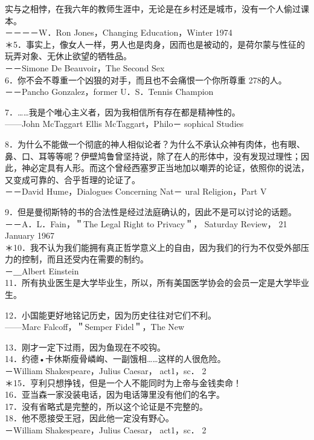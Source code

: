 实与之相悖，在我六年的教师生涯中，无论是在乡村还是城市，没有一个人偷过课本。\\
－－－－W．Ron Jones，Changing Education，Winter 1974\\
＊5．事实上，像女人一样，男人也是肉身，因而也是被动的，是荷尔蒙与性征的玩弄对象、无休止欲望的牺牲品。\\
－－Simone De Beauvoir，The Second Sex\\
6．你不会不尊重一个凶狠的对手，而且也不会痛恨一个你所尊重 278的人。\\
－－Pancho Gonzalez，former U．S．Tennis Champion

7．……我是个唯心主义者，因为我相信所有存在都是精神性的。\\
——John McTaggart Ellis McTaggart，Philo－ sophical Studies

8．为什么不能做一个彻底的神人相似论者？为什么不承认众神有肉体，也有眼、鼻、口、耳等等呢？伊壁鸠鲁曾坚持说，除了在人的形体中，没有发现过理性；因此，神必定具有人形。而这个曾经西塞罗正当地加以嘲弄的论证，依照你的说法，又变成可靠的、合乎哲理的论证了。\\
－－David Hume，Dialogues Concerning Nat－ ural Religion，Part V

9．但是曼彻斯特的书的合法性是经过法庭确认的，因此不是可以讨论的话题。\\
－－A．L．Fain，＂The Legal Right to Privacy＂， Saturday Review， 21 January 1967\\
＊10．我不认为我们能拥有真正哲学意义上的自由，因为我们的行为不仅受外部压力的控制，而且还受内在需要的制约。\\
－＿Albert Einstein\\
11．所有执业医生是大学毕业生，所以，所有美国医学协会的会员一定是大学毕业生。

12．小国能更好地铭记历史，因为历史往往对它们不利。\\
——Marc Falcoff，＂Semper Fidel＂，The New

13．刚才一定下过雨，因为鱼现在不咬钩。\\
14．约德•卡休斯瘦骨嶙峋、一副饿相……这样的人很危险。\\
－William Shakespeare，Julius Caesar， act1，sc． 2\\
＊15．亨利只想挣钱，但是一个人不能同时为上帝与金钱卖命！\\
16．亚当森一家没装电话，因为电话簿里没有他们的名字。\\
17．没有省略式是完整的，所以这个论证是不完整的。\\
18．他不愿接受王冠，因此他一定没有野心。\\
－William Shakespeare，Julius Caesar， act1，sc． 2

